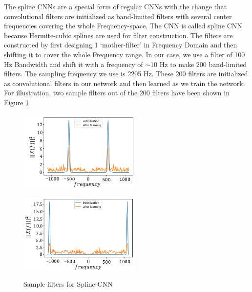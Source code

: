 The spline CNNs are a special form of regular CNNs with the change that convolutional filters are initialized as band-limited filters with several center frequencies covering the whole Frequency-space. The CNN is called spline CNN because Hermite-cubic splines are used for filter construction. The filters are constructed by first designing 1 `mother-filter' in Frequency Domain and then shifting it to cover the whole Frequency range. In our case, we use a filter of 100 Hz Bandwidth and shift it with a frequency of $\sim$10 Hz to make 200 band-limited filters. The sampling frequency we use is 2205 Hz. These 200 filters are initialized as convolutional filters in our network and then learned as we train the network. For illustration, two sample filters out of the 200 filters have been shown in Figure \ref{fig:twofils}
\begin{figure}
\centering
\parbox{6cm}{
\includegraphics[width=6cm]{./Figures/park_fil1.png}
\label{fig:2figsA}}
\qquad
\begin{minipage}{6cm}
\includegraphics[width=6cm]{./Figures/park_fil2.png}
\label{fig:2figsB}
\end{minipage}
\caption{Sample filters for Spline-CNN}
\label{fig:twofils}
\end{figure}

